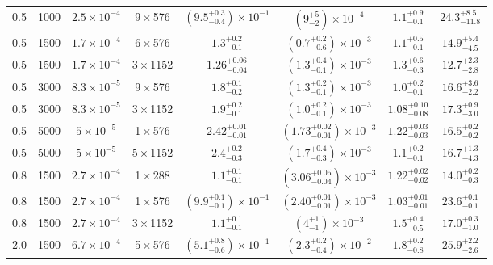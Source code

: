 \begin{table}
{{\begin{tabular}{
    c c c c
    c c c c
}
0.5 & 1000 & $2.5\times 10^{-4}$ & 9\,$\times$\,576 & $\left(9.5_{-0.4}^{+0.3}\right)\times 10^{-1}$ & $\left(9_{-2}^{+5}\right)\times 10^{-4}$ & $1.1_{-0.1}^{+0.9}$ & $24.3_{-11.8}^{+8.5}$ \\

0.5 & 1500 & $1.7\times 10^{-4}$ & 6\,$\times$\,576 & $1.3_{-0.1}^{+0.2}$ & $\left(0.7_{-0.6}^{+0.2}\right)\times 10^{-3}$ & $1.1_{-0.1}^{+0.5}$ & $14.9_{-4.5}^{+5.4}$ \\

0.5 & 1500 & $1.7\times 10^{-4}$ & 3\,$\times$\,1152 & $1.26_{-0.04}^{+0.06}$ & $\left(1.3_{-0.1}^{+0.4}\right)\times 10^{-3}$ & $1.3_{-0.3}^{+0.6}$ & $12.7_{-2.8}^{+2.3}$ \\

0.5 & 3000 & $8.3\times 10^{-5}$ & 9\,$\times$\,576 & $1.8_{-0.2}^{+0.1}$ & $\left(1.3_{-0.1}^{+0.2}\right)\times 10^{-3}$ & $1.0_{-0.1}^{+0.2}$ & $16.6_{-2.2}^{+3.6}$ \\

0.5 & 3000 & $8.3\times 10^{-5}$ & 3\,$\times$\,1152 & $1.9_{-0.1}^{+0.2}$ & $\left(1.0_{-0.1}^{+0.2}\right)\times 10^{-3}$ & $1.08_{-0.08}^{+0.10}$ & $17.3_{-3.0}^{+0.9}$ \\

0.5 & 5000 & $5\times 10^{-5}$ & 1\,$\times$\,576 & $2.42_{-0.01}^{+0.01}$ & $\left(1.73_{-0.01}^{+0.02}\right)\times 10^{-3}$ & $1.22_{-0.03}^{+0.03}$ & $16.5_{-0.2}^{+0.2}$ \\

0.5 & 5000 & $5\times 10^{-5}$ & 5\,$\times$\,1152 & $2.4_{-0.3}^{+0.2}$ & $\left(1.7_{-0.3}^{+0.4}\right)\times 10^{-3}$ & $1.1_{-0.1}^{+0.2}$ & $16.7_{-4.3}^{+1.3}$ \\

0.8 & 1500 & $2.7\times 10^{-4}$ & 1\,$\times$\,288 & $1.1_{-0.1}^{+0.1}$ & $\left(3.06_{-0.04}^{+0.05}\right)\times 10^{-3}$ & $1.22_{-0.02}^{+0.02}$ & $14.0_{-0.3}^{+0.2}$ \\

0.8 & 1500 & $2.7\times 10^{-4}$ & 1\,$\times$\,576 & $\left(9.9_{-0.1}^{+0.1}\right)\times 10^{-1}$ & $\left(2.40_{-0.01}^{+0.01}\right)\times 10^{-3}$ & $1.03_{-0.01}^{+0.01}$ & $23.6_{-0.1}^{+0.1}$ \\

0.8 & 1500 & $2.7\times 10^{-4}$ & 3\,$\times$\,1152 & $1.1_{-0.1}^{+0.1}$ & $\left(4_{-1}^{+1}\right)\times 10^{-3}$ & $1.5_{-0.5}^{+0.4}$ & $17.0_{-1.0}^{+0.3}$ \\

2.0 & 1500 & $6.7\times 10^{-4}$ & 5\,$\times$\,576 & $\left(5.1_{-0.6}^{+0.8}\right)\times 10^{-1}$ & $\left(2.3_{-0.4}^{+0.2}\right)\times 10^{-2}$ & $1.8_{-0.8}^{+0.2}$ & $25.9_{-2.6}^{+2.2}$ \\


\end{tabular}}}
\end{table}
